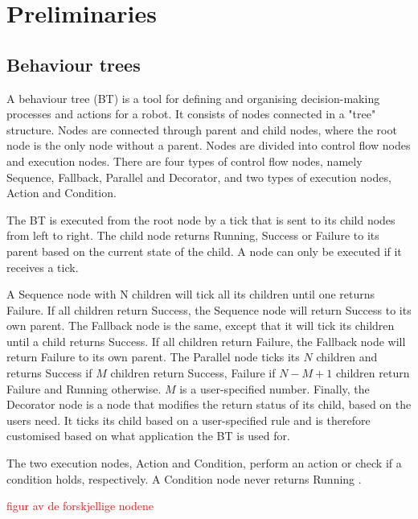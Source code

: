 \chapter{Preliminaries}

\section{Behaviour trees}
A behaviour tree (BT) is a tool for defining and organising decision-making processes and actions for a robot. It consists of nodes connected in a "tree" structure. Nodes are connected through parent and child nodes, where the root node is the only node without a parent. Nodes are divided into control flow nodes and execution nodes. There are four types of control flow nodes, namely Sequence, Fallback, Parallel and Decorator, and two types of execution nodes, Action and Condition.

The BT is executed from the root node by a tick that is sent to its child nodes from left to right. The child node returns Running, Success or Failure to its parent based on the current state of the child. A node can only be executed if it receives a tick.

A Sequence node with N children will tick all its children until one returns Failure. If all children return Success, the Sequence node will return Success to its own parent. The Fallback node is the same, except that it will tick its children until a child returns Success. If all children return Failure, the Fallback node will return Failure to its own parent.
The Parallel node ticks its $N$ children and returns Success if $M$ children return Success, Failure if $N-M+1$ children return Failure and Running otherwise. $M$ is a user-specified number.
Finally, the Decorator node is a node that modifies the return status of its child, based on the users need. It ticks its child based on a user-specified rule and is therefore customised based on what application the BT is used for.

The two execution nodes, Action and Condition, perform an action or check if a condition holds, respectively. A Condition node never returns Running \cite[p. 5-9]{colledanchise_behavior_2018}.

\textcolor{red}{figur av de forskjellige nodene}


